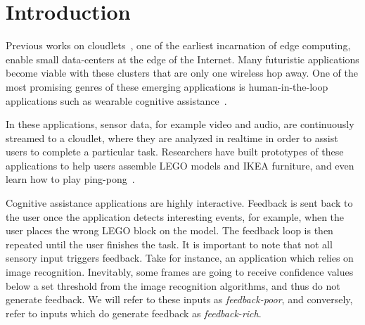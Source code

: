 \section{Introduction}

Previous works on cloudlets~\cite{satya2009case,Ha:ImpactMobile}, one of the earliest incarnation of edge computing, enable small data-centers at the edge of the Internet. 
Many futuristic applications become viable with these clusters that are only one wireless hop away. 
One of the most promising genres of these emerging applications is human-in-the-loop applications such as wearable cognitive assistance~\cite{Ha:TowardsWearableCogAssist}. 

In these applications, sensor data, for example video and audio, are continuously streamed to a cloudlet, where they are analyzed in realtime in order to assist users to complete a particular task. 
Researchers have built prototypes of these applications to help users assemble LEGO models and IKEA furniture, and even learn how to play ping-pong~\cite{satya2009case,Chen:EarlyImplementation}.

Cognitive assistance applications are highly interactive. 
Feedback is sent back to the user once the application detects interesting events, for example, when the user places the wrong LEGO block on the model.
The feedback loop is then repeated until the user finishes the task.
It is important to note that not all sensory input triggers feedback.
Take for instance, an application which relies on image recognition.
Inevitably, some frames are going to receive confidence values below a set threshold from the image recognition algorithms, and thus do not generate feedback.
We will refer to these inputs as \emph{feedback-poor}, and conversely, refer to inputs which do generate feedback as \emph{feedback-rich}.

